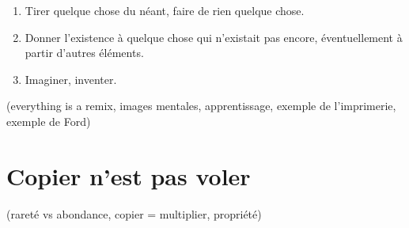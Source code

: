\begin{enumerate}
\item Tirer quelque chose du néant, faire de rien quelque chose.
\item Donner l'existence à quelque chose qui n'existait pas encore, éventuellement à partir d'autres éléments.
\item Imaginer, inventer.
\end{enumerate}\bigskip



(everything is a remix, images mentales, apprentissage, exemple de l'imprimerie, exemple de Ford)
\section{Copier n'est pas voler}
(rareté vs abondance, copier = multiplier, propriété)
